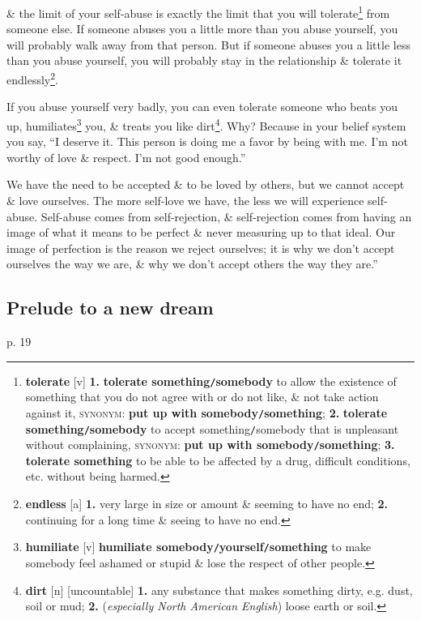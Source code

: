 \documentclass[oneside]{book}
\numberwithin{equation}{section}
\begin{document}
 \& the limit of your self-abuse is exactly the limit that you will tolerate\footnote{\textbf{tolerate} [v] \textbf{1.} \textbf{tolerate something\texttt{/}somebody} to allow the existence of something that you do not agree with or do not like, \& not take action against it, \textsc{synonym}: \textbf{put up with somebody\texttt{/}something}; \textbf{2.} \textbf{tolerate something\texttt{/}somebody} to accept something\texttt{/}somebody that is unpleasant without complaining, \textsc{synonym}: \textbf{put up with somebody\texttt{/}something}; \textbf{3.} \textbf{tolerate something} to be able to be affected by a drug, difficult conditions, etc. without being harmed.} from someone else. If someone abuses you a little more than you abuse yourself, you will probably walk away from that person. But if someone abuses you a little less than you abuse yourself, you will probably stay in the relationship \& tolerate it endlessly\footnote{\textbf{endless} [a] \textbf{1.} very large in size or amount \& seeming to have no end; \textbf{2.} continuing for a long time \& seeing to have no end.}.

If you abuse yourself very badly, you can even tolerate someone who beats you up, humiliates\footnote{\textbf{humiliate} [v] \textbf{humiliate somebody\texttt{/}yourself\texttt{/}something} to make somebody feel ashamed or stupid \& lose the respect of other people.} you, \& treats you like dirt\footnote{\textbf{dirt} [n] [uncountable] \textbf{1.} any substance that makes something dirty, e.g. dust, soil or mud; \textbf{2.} (\textit{especially North American English}) loose earth or soil.}. Why? Because in your belief system you say, ``I deserve it. This person is doing me a favor by being with me. I'm not worthy of love \& respect. I'm not good enough.''

We have the need to be accepted \& to be loved by others, but we cannot accept \& love ourselves. The more self-love we have, the less we will experience self-abuse. Self-abuse comes from self-rejection, \& self-rejection comes from having an image of what it means to be perfect \& never measuring up to that ideal. Our image of perfection is the reason we reject ourselves; it is why we don't accept ourselves the way we are, \& why we don't accept others the way they are.''

\subsection{Prelude to a new dream}
p. 19
\end{document}

